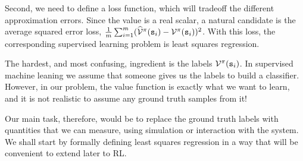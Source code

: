 Second, we need to define a loss function, which will tradeoff the different approximation errors. Since the value is a real scalar, a natural candidate is the average squared error loss, $\frac{1}{m}\sum_{i=1}^m (\widehat{\mathcal{V}}^\pi({\tt s}_i) - \mathcal{V}^\pi({\tt s}_i))^2$. With this loss, the corresponding supervised learning problem is least squares regression.

The hardest, and most confusing, ingredient is the labels
$\mathcal{V}^\pi({\tt s}_i)$. In supervised machine leaning we assume
that someone gives us the labels to build a classifier.
However, in our problem, the value function is exactly what we want to learn, and it is not realistic to assume any ground truth samples from it!

Our main task, therefore, would be to replace the ground truth labels with quantities that we can measure, using simulation or interaction with the system. We shall start by formally defining least squares regression in a way that will be convenient to extend later to RL.





